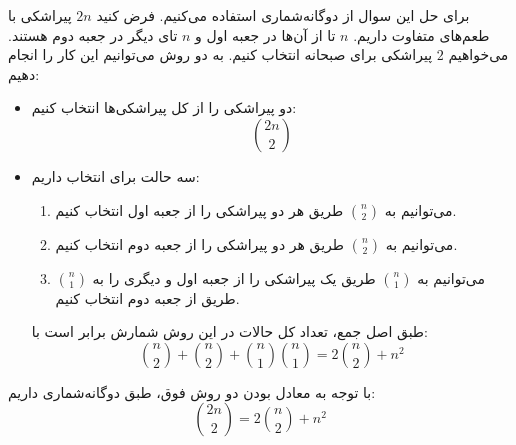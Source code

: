 \p
برای حل این سوال از دوگانه‌شماری استفاده می‌کنیم. فرض کنید 
$2n$
پیراشکی با طعم‌های متفاوت داریم. 
$n$
تا از آن‌ها در جعبه اول و 
$n$
تای دیگر در جعبه دوم هستند. می‌خواهیم 
$2$
پیراشکی برای صبحانه انتخاب کنیم. به دو روش می‌توانیم این کار را انجام دهیم:
\begin{itemize}
    \item
    دو پیراشکی را از کل پیراشکی‌ها انتخاب کنیم:
    $$\binom{2n}{2}$$

    \item
    سه حالت برای انتخاب داریم:
        \begin{enumerate}
        \item 
        می‌توانیم به 
        $\binom{n}{2}$
        طریق هر دو پیراشکی را از جعبه اول انتخاب کنیم.

        \item
        می‌توانیم به
        $\binom{n}{2}$
        طریق هر دو پیراشکی را از جعبه دوم انتخاب کنیم.

        \item
        می‌توانیم به 
        $\binom{n}{1}$
        طریق یک پیراشکی را از جعبه اول و دیگری را
        به
        $\binom{n}{1}$
        طریق از جعبه دوم انتخاب کنیم.
        \end{enumerate}

    \p
    طبق اصل جمع، تعداد کل حالات در این روش شمارش برابر است با:
    $$\binom{n}{2} + \binom{n}{2} + \binom{n}{1} \binom{n}{1} = 2\binom{n}{2} + n^2$$
\end{itemize}

\p
با توجه به معادل بودن دو روش فوق، طبق دوگانه‌شماری داریم:
$$\binom{2n}{2} = 2\binom{n}{2} + n^2$$